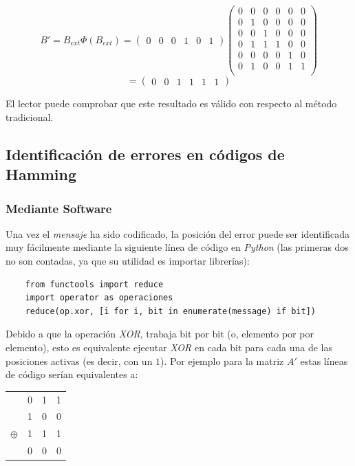 \documentclass{article}
\begin{document}
$$
B' = B_{ext} \Phi(B_{ext}) = \begin{pmatrix}
    0 & 0 & 0 & 1 & 0 & 1
\end{pmatrix}
\begin{pmatrix}
    0 & 0 & 0 & 0 & 0 & 0 \\
    0 & 1 & 0 & 0 & 0 & 0 \\
    0 & 0 & 1 & 0 & 0 & 0 \\
    0 & 1 & 1 & 1 & 0 & 0 \\
    0 & 0 & 0 & 0 & 1 & 0 \\
    0 & 1 & 0 & 0 & 1 & 1 \\
\end{pmatrix}
$$$$
= \begin{pmatrix}
    0 & 0 & 1 & 1 & 1 & 1
\end{pmatrix}
$$

El lector puede comprobar que este resultado es válido con respecto al método tradicional.

\subsection{Identificación de errores en códigos de Hamming}

\subsubsection{Mediante Software}

Una vez el \textit{mensaje} ha sido codificado, la posición del error puede ser identificada muy fácilmente mediante la siguiente línea de código en \textit{Python} (las primeras dos no son contadas, ya que su utilidad es importar librerías):

\begin{verbatim}
    from functools import reduce
    import operator as operaciones
    reduce(op.xor, [i for i, bit in enumerate(message) if bit])
\end{verbatim}

Debido a que la operación \textit{XOR}, trabaja bit por bit (o, elemento por por elemento), esto es equivalente ejecutar \textit{XOR} en cada bit para cada una de las posiciones activas (es decir, con un $1$). Por ejemplo para la matriz $A'$ estas líneas de código serían equivalentes a:

\begin{center}
\begin{tabular}{c c c c}
    & 0 & 1 & 1 \\
    & 1 & 0 & 0 \\
    $\oplus$ & 1 & 1 & 1 \\
    \hline
    & 0 & 0 & 0
\end{tabular}
\end{center}
\end{document}
